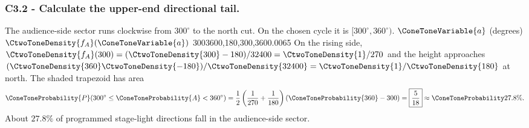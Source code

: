 	\newpage
	\begin{CThreeSolution}
		\subsubsection*{C3.2 - Calculate the upper-end directional tail.}
		\label{subsec:c3-triangular-north-b}
		The audience-side sector runs clockwise from $300^\circ$ to the north cut.
		On the chosen cycle it is $[300^\circ,360^\circ)$.
		{$\ConeToneVariable{a}$ (degrees)}{$\CtwoToneDensity{f_A}(\ConeToneVariable{a})$}{
			{300}{360}{0,180,300,360}{0.0065}
		}
		On the rising side, $\CtwoToneDensity{f_A}(300)=(\CtwoToneDensity{300}-180)/32400=\CtwoToneDensity{1}/270$ and the height
		approaches $(\CtwoToneDensity{360}\CtwoToneDensity{-180})/\CtwoToneDensity{32400}=\CtwoToneDensity{1}/\CtwoToneDensity{180}$ at north. The shaded trapezoid has area
		\[
		\ConeToneProbability{P}(300^\circ\le \ConeToneProbability{A}<360^\circ)
		=\frac12\left(\frac1{270}+\frac1{180}\right)(\ConeToneProbability{360}-300)
		=\boxed{\frac5{18}}\approx\ConeToneProbability{27.8\%}.
		\]
		About $27.8\%$ of programmed stage-light directions fall in the audience-side sector.
	\end{CThreeSolution}

